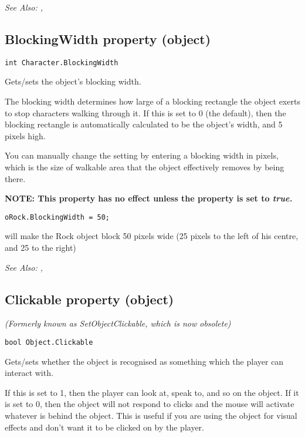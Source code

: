 \it{See Also:} ,


\subsection{BlockingWidth property (object)}\label{Object.BlockingWidth}%

\begin{verbatim}
int Character.BlockingWidth
\end{verbatim}
Gets/sets the object's blocking width.

The blocking width determines how large of a blocking rectangle the object exerts to
stop characters walking through it. If this is set to 0 (the default), then the
blocking rectangle is automatically calculated to be the object's width, and 5 pixels
high.

You can manually change the setting by entering a blocking width in pixels, which is the
size of walkable area that the object effectively removes by being there.

\bf{NOTE:} This property has no effect unless the  property
is set to \it{true}.

\begin{verbatim}
oRock.BlockingWidth = 50;
\end{verbatim}
will make the Rock object block 50 pixels wide (25 pixels to the left of his centre, and 25 to the right)

\it{See Also:} ,


\subsection{Clickable property (object)}\label{Object.Clickable}%

\it{(Formerly known as SetObjectClickable, which is now obsolete)}

\begin{verbatim}
bool Object.Clickable
\end{verbatim}
Gets/sets whether the object is recognised as something which the player can
interact with.

If this is set to 1, then the player can look at, speak to, and so on the
object. If it is set to 0, then the object will not respond to clicks and
the mouse will activate whatever is behind the object.
This is useful if you are using the object for visual effects and don't
want it to be clicked on by the player.

